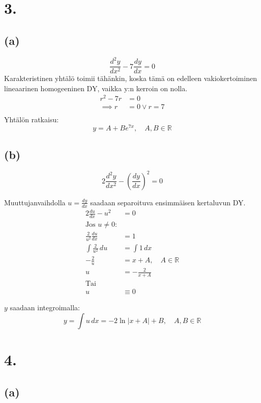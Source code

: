\documentclass{article}
\begin{document}
\section*{3.}

\subsection*{(a)}

\[
  \frac{d^2 y}{d x^2} - 7\frac{dy}{dx} = 0
\]
Karakteristinen yhtälö toimii tähänkin, koska tämä on edelleen vakiokertoiminen
lineaarinen homogeeninen DY, vaikka y:n kerroin on nolla.
\begin{align*}
  r^2 - 7r &= 0 \\
  \implies r &= 0 \vee r = 7 \\
\end{align*}
Yhtälön ratkaisu:
\[
  y = A + Be^{7x}, \quad A,B \in \mathbb{R}
\]

\subsection*{(b)}

\[
  2\frac{d^2 y}{d x^2} - (\frac{dy}{dx})^2 = 0
\]

Muuttujanvaihdolla $u = \frac{dy}{dx}$ saadaan separoituva ensimmäisen
kertaluvun DY.
\begin{align*}
  2\frac{du}{dx} - u^2 &= 0 \\
  \text{Jos $u \neq 0$:} \\
  \frac{2}{u^2}\frac{du}{dx} &= 1 \\
  \int \frac{2}{u^2}\,du &= \int 1\,dx \\
  -\frac{2}{u} &= x + A, \quad A \in \mathbb{R} \\
  u &= -\frac{2}{x + A} \\
  \text{Tai} \\
  u &\equiv 0
\end{align*}

$y$ saadaan integroimalla:
\[
  y = \int u\,dx = -2\ln|x + A| + B, \quad A,B \in \mathbb{R}
\]

\section*{4.}

\subsection*{(a)}
\end{document}
